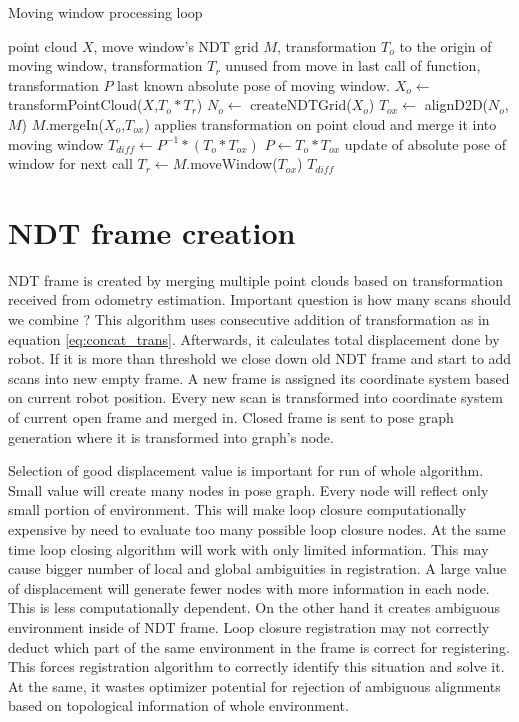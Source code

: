 \begin{algorithm}
\label{alg:move_window}
    \caption{Moving window processing loop}
\begin{algorithmic}[1]
\Require point cloud $X$, move window's \gls{NDT} grid $M$, transformation $T_{o}$ to the origin of moving window, transformation $T_{r}$ unused from move in last call of function, transformation $P$  last known absolute pose of moving window.  
	 \State $X_{o} \gets$ transformPointCloud($X$,$T_{o} * T_{r}$)
	 \State $N_{o} \gets$ createNDTGrid($X_{o}$)
	 \State $T_{ox} \gets$ alignD2D($N_{o}$,$M$)
	 \State $M$.mergeIn($X_{o}$,$T_{ox}$)
	 \Comment applies transformation on point cloud and merge it into moving window
	 \State $T_{diff} \gets P^{-1} * (T_{o} * T_{ox})$
	 \State $P \gets T_{o} * T_{ox}$
	 \Comment update of absolute pose of window for next call 
	 \State $T_{r} \gets M$.moveWindow($T_{ox}$)
	 \State \Return $T_{diff}$
 \EndFunction
\end{algorithmic}
\end{algorithm}

\newpage

\section{NDT frame creation}
\label{sec:NDT_frame}
\gls{NDT} frame is created by merging multiple point clouds based on transformation received from odometry estimation. Important question is how many scans should we combine ? This algorithm uses consecutive addition of transformation as in equation \ref{eq:concat_trans}. Afterwards, it calculates total displacement done by robot. If it is more than threshold we close down old \gls{NDT} frame and start to add scans into new empty frame. A new frame is assigned its coordinate system based on current robot position. Every new scan is transformed into coordinate system of current open frame and merged in. Closed frame is sent to pose graph generation where it is transformed into graph's node.

Selection of good displacement value is important for run of whole algorithm. Small value will create many nodes in pose graph. Every node will reflect only small portion of environment. This will make loop closure computationally expensive by need to evaluate too many possible loop closure nodes. At the same time loop closing algorithm will work with only limited information. This may cause bigger number of local and global ambiguities in registration. A large value of displacement will generate fewer nodes with more information in each node. This is less computationally dependent. On the other hand it creates ambiguous environment inside of \gls{NDT} frame. Loop closure registration may not correctly deduct which part of the same environment in the frame is correct for registering. This forces registration algorithm to correctly identify this situation and solve it. At the same, it wastes optimizer potential for rejection of ambiguous alignments based on topological information of whole environment. 

